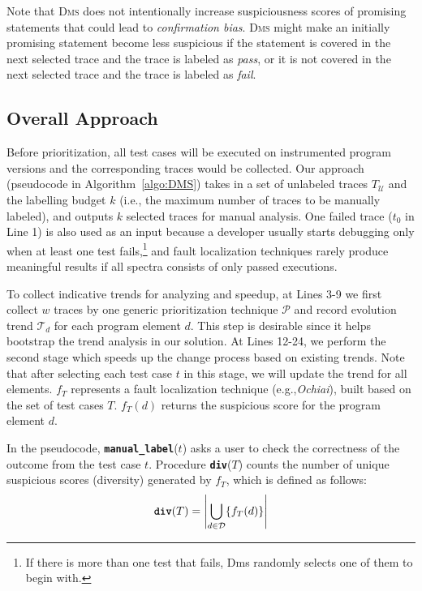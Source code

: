 Note that \textsc{Dms} does not intentionally increase suspiciousness scores of promising statements that could lead to {\em confirmation bias}. 
\textsc{Dms} might make an initially promising statement become less suspicious if the statement is covered in the next selected trace and the trace is labeled as {\em pass}, or it is not covered in the next selected trace and the trace is labeled as {\em fail}.

\subsection{Overall Approach}

Before prioritization, all test cases will be executed on instrumented program versions and the corresponding traces would be collected.
Our approach (pseudocode in Algorithm~\ref{algo:DMS}) takes in a set of unlabeled traces $T_\mathcal{U}$ and the labelling budget $k$ (i.e., the maximum number of traces to be manually labeled), and outputs $k$ selected traces for manual analysis.
One failed trace ($t_{0}$ in Line 1) is also used as an input because a developer usually starts debugging only when at least one test fails,\footnote{If there is more than one test that fails, {\sc Dms} randomly selects one of them to begin with.} and fault localization techniques rarely produce meaningful results if all spectra consists of only passed executions.

To collect indicative trends for analyzing and speedup, at Lines 3-9 we first collect $w$ traces by one generic prioritization technique $\mathcal{P}$ and record evolution trend $\mathcal{T}_{d}$ for each program element $d$. This step is desirable since it helps bootstrap the trend analysis in our solution.
At Lines 12-24, we perform the second stage which speeds up the change process based on existing trends. Note that after selecting each test case $t$ in this stage, we will update the trend for all elements. $f_{T}$ represents a fault localization technique (e.g.,{\em Ochiai}), built based on the set of test cases $T$. $f_{T}(d)$ returns the suspicious score for the program element $d$.




In the pseudocode, \texttt{\textbf{manual\_label}}($t$) asks a user to check
the correctness of the outcome from the test case $t$. Procedure \texttt{\textbf{div}}($T$)
counts the number of unique suspicious scores (diversity) generated by $f_T$, which is defined as follows:
\begin{equation}
	\texttt{\textbf{div}}(T) = \left| \bigcup\limits_{d \in \mathcal{D}} \{f_{T}(d)\} \right|
\end{equation}

